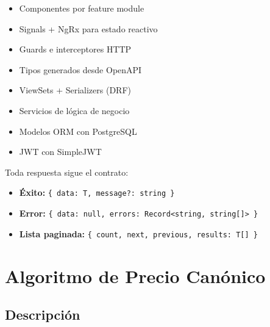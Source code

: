 \documentclass[11pt,a4paper]{article}
\begin{document}
\begin{tcbitemize}[raster columns=2, raster equal height,
  colback=blkCard, colframe=blkGold!50, arc=4pt, boxrule=0.5pt,
  fontupper=\small\color{blkText}]
\tcbitem[title={\textcolor{blkGold}{Frontend (Angular 19)}}]
  \begin{itemize}[leftmargin=12pt, itemsep=2pt]
    \item Componentes por feature module
    \item Signals + NgRx para estado reactivo
    \item Guards e interceptores HTTP
    \item Tipos generados desde OpenAPI
  \end{itemize}
\tcbitem[title={\textcolor{blkGold}{Backend (Django REST)}}]
  \begin{itemize}[leftmargin=12pt, itemsep=2pt]
    \item ViewSets + Serializers (DRF)
    \item Servicios de lógica de negocio
    \item Modelos ORM con PostgreSQL
    \item JWT con SimpleJWT
  \end{itemize}
\end{tcbitemize}

\begin{tcolorbox}[infobox, title={Contrato API}]
Toda respuesta sigue el contrato:
\begin{itemize}[itemsep=2pt]
  \item \textbf{Éxito:} \texttt{\{ data: T, message?: string \}}
  \item \textbf{Error:} \texttt{\{ data: null, errors: Record<string, string[]> \}}
  \item \textbf{Lista paginada:} \texttt{\{ count, next, previous, results: T[] \}}
\end{itemize}
\end{tcolorbox}

\section{Algoritmo de Precio Canónico}

\subsection{Descripción}
\end{document}
